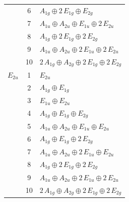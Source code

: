 \documentclass[11pt]{article}
\begin{document}
\begin{longtable}{l c p{}}
 & 6 & $A_{1g}\oplus 2\,E_{1g}\oplus E_{2g}$\\
 & 7 & $A_{1u}\oplus A_{2u}\oplus E_{1u}\oplus 2\,E_{2u}$\\
 & 8 & $A_{1g}\oplus 2\,E_{1g}\oplus 2\,E_{2g}$\\
 & 9 & $A_{1u}\oplus A_{2u}\oplus 2\,E_{1u}\oplus 2\,E_{2u}$\\
 & 10 & $2\,A_{1g}\oplus A_{2g}\oplus 2\,E_{1g}\oplus 2\,E_{2g}$\\
\hline
$E_{2u}$ & 1 & $E_{2u}$\\
 & 2 & $A_{1g}\oplus E_{1g}$\\
 & 3 & $E_{1u}\oplus E_{2u}$\\
 & 4 & $A_{1g}\oplus E_{1g}\oplus E_{2g}$\\
 & 5 & $A_{1u}\oplus A_{2u}\oplus E_{1u}\oplus E_{2u}$\\
 & 6 & $A_{1g}\oplus E_{1g}\oplus 2\,E_{2g}$\\
 & 7 & $A_{1u}\oplus A_{2u}\oplus 2\,E_{1u}\oplus E_{2u}$\\
 & 8 & $A_{1g}\oplus 2\,E_{1g}\oplus 2\,E_{2g}$\\
 & 9 & $A_{1u}\oplus A_{2u}\oplus 2\,E_{1u}\oplus 2\,E_{2u}$\\
 & 10 & $2\,A_{1g}\oplus A_{2g}\oplus 2\,E_{1g}\oplus 2\,E_{2g}$\\
\hline
\end{longtable}
\end{document}
